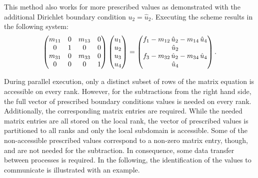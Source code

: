 This method also works for more prescribed values as demonstrated with the additional Dirichlet boundary condition $u_2 = \hat{u}_2$. Executing the scheme results in the following system:
\begin{equation*}
  \begin{array}{llll}
    \left(\begin{matrix}m_{11} & 0 & m_{13} & 0\\ 0 & 1 & 0 & 0 \\ m_{31} & 0 & m_{33} & 0 \\ 0 & 0 & 0 & 1\end{matrix}\right)
    \left(\begin{matrix}u_1 \\ u_2 \\ u_3 \\ u_4\end{matrix}\right) 
    = \left(\begin{matrix}f_1 - m_{12}\,\hat{u}_2 - m_{14}\,\hat{u}_4 \\
          \hat{u}_2 \\ 
           f_3 - m_{32}\,\hat{u}_2 - m_{34}\,\hat{u}_4 \\
          \hat{u}_4\end{matrix}\right).
  \end{array}
\end{equation*}

During parallel execution, only a distinct subset of rows of the matrix equation is accessible on every rank. 
However, for the subtractions from the right hand side, the full vector of prescribed boundary conditions values is needed on every rank. Additionally, the corresponding matrix entries are required. While the needed matrix entries are all stored on the local rank, the vector of prescribed values is partitioned to all ranks and only the local subdomain is accessible. 
Some of the non-accessible prescribed values correspond to a non-zero matrix entry, though, and are not needed for the subtraction. In consequence, some data transfer between processes is required. In the following, the identification of the values to communicate is illustrated with an example.

